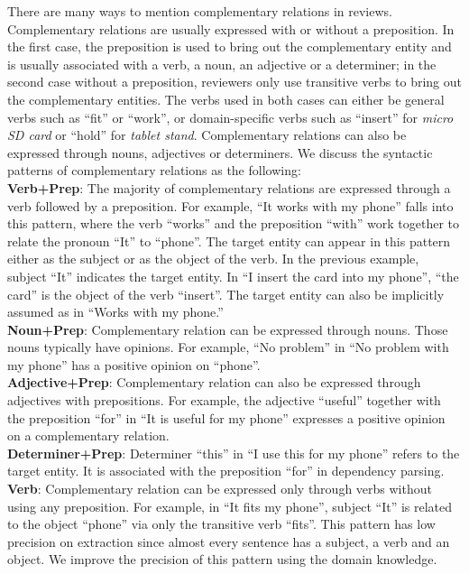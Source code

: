 There are many ways to mention complementary relations in reviews. Complementary relations are usually expressed with or without a preposition. In the first case, the preposition is used to bring out the complementary entity and is usually associated with a verb, a noun, an adjective or a determiner; in the second case without a preposition, reviewers only use transitive verbs to bring out the complementary entities. The verbs used in both cases can either be general verbs such as ``fit'' or ``work'', or domain-specific verbs such as ``insert'' for \textit{micro SD card} or ``hold'' for \textit{tablet stand}. Complementary relations can also be expressed through nouns, adjectives or determiners. We discuss the syntactic patterns of complementary relations as the following:\\
\textbf{Verb+Prep}: The majority of complementary relations are expressed through a verb followed by a preposition. For example, ``It works with my phone'' falls into this pattern, where the verb ``works'' and the preposition ``with'' work together to relate the pronoun ``It'' to ``phone''. The target entity can appear in this pattern either as the subject or as the object of the verb. In the previous example, subject ``It'' indicates the target entity. In ``I insert the card into my phone'', ``the card'' is the object of the verb ``insert''. The target entity can also be implicitly assumed as in ``Works with my phone.''\\
\textbf{Noun+Prep}: Complementary relation can be expressed through nouns. Those nouns typically have opinions. For example, ``No problem'' in ``No problem with my phone'' has a positive opinion on ``phone''.\\
\textbf{Adjective+Prep}: Complementary relation can also be expressed through adjectives with prepositions. For example, the adjective ``useful'' together with the preposition ``for'' in ``It is useful for my phone'' expresses a positive opinion on a complementary relation.\\
\textbf{Determiner+Prep}: Determiner ``this'' in ``I use this for my phone'' refers to the target entity. It is associated with the preposition ``for'' in dependency parsing.\\
\textbf{Verb}: Complementary relation can be expressed only through verbs without using any preposition. For example, in ``It fits my phone'', subject ``It'' is related to the object ``phone'' via only the transitive verb ``fits''. This pattern has low precision on extraction since almost every sentence has a subject, a verb and an object. We improve the precision of this pattern using the domain knowledge.


